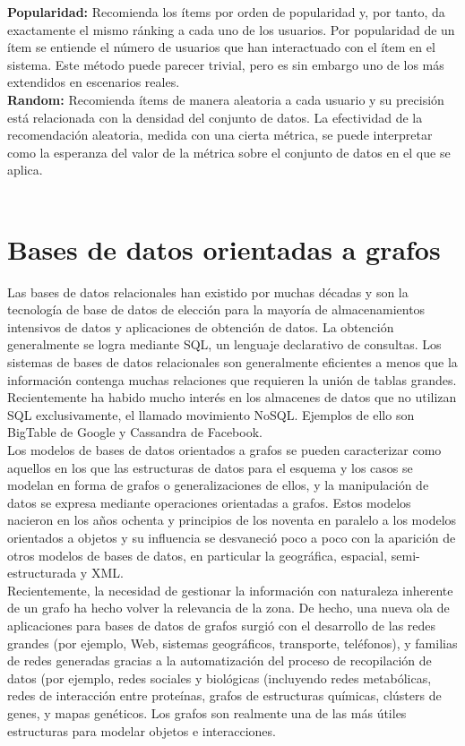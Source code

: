 		\textbf{Popularidad:} Recomienda los ítems por orden de popularidad y, por tanto, da exactamente el mismo ránking a cada uno de los usuarios. Por popularidad de un ítem se entiende el número de usuarios que han interactuado con el ítem en el sistema. Este método puede parecer trivial, pero es sin embargo uno de los más extendidos en escenarios reales.\\
		\newpage
		\textbf{Random:} Recomienda ítems de manera aleatoria a cada usuario y su precisión está relacionada con la densidad del conjunto de datos. La efectividad de la recomendación aleatoria, medida con una cierta métrica, se puede interpretar como la esperanza del valor de la métrica sobre el conjunto de datos en el que se aplica. \cite{11}\\\\

 \section{Bases de datos orientadas a grafos}
	Las bases de datos relacionales han existido por muchas décadas y son la tecnología de base de datos de elección para la mayoría de almacenamientos intensivos de datos y aplicaciones de obtención de datos. La obtención generalmente se logra mediante SQL, un lenguaje declarativo de consultas. Los sistemas de bases de datos relacionales son generalmente eficientes a menos que la información contenga muchas relaciones que requieren la unión de tablas grandes. Recientemente ha habido mucho interés en los almacenes de datos que no utilizan SQL exclusivamente, el llamado movimiento NoSQL. Ejemplos de ello son BigTable de Google y Cassandra de Facebook. \cite{7}\\

	Los modelos de bases de datos orientados a grafos se pueden caracterizar como aquellos en los que las estructuras de datos para el esquema y los casos se modelan en forma de grafos o generalizaciones de ellos, y la manipulación de datos se expresa mediante operaciones orientadas a grafos. Estos modelos nacieron en los años ochenta y principios de los noventa en paralelo a los modelos orientados a objetos y su influencia se desvaneció poco a poco con la aparición de otros modelos de bases de datos, en particular la geográfica, espacial, semi-estructurada y XML.\\

	Recientemente, la necesidad de gestionar la información con naturaleza inherente de un grafo ha hecho volver la relevancia de la zona. De hecho, una nueva ola de aplicaciones para bases de datos de grafos surgió con el desarrollo de las redes grandes (por ejemplo, Web, sistemas geográficos, transporte, teléfonos), y familias de redes generadas gracias a la automatización del proceso de recopilación de datos (por ejemplo, redes sociales y biológicas (incluyendo redes metabólicas, redes de interacción entre proteínas, grafos de estructuras químicas, clústers de genes, y mapas genéticos. Los grafos son realmente una de las más útiles estructuras para modelar objetos e interacciones.\cite{8}\\

